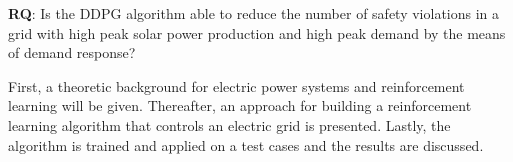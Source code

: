\documentclass[class=book, crop=false, 11pt]{standalone}
\begin{document}
\begin{displayquote}
\textbf{RQ}: Is the DDPG algorithm able to reduce the number of safety violations in a grid with high peak solar power production and high peak demand by the means of demand response? 
\end{displayquote}

First, a theoretic background for electric power systems and reinforcement learning will be given. Thereafter, an approach for building a reinforcement learning algorithm that controls an electric grid is presented. Lastly, the algorithm is trained and applied on a test cases and the results are discussed.
\end{document}
